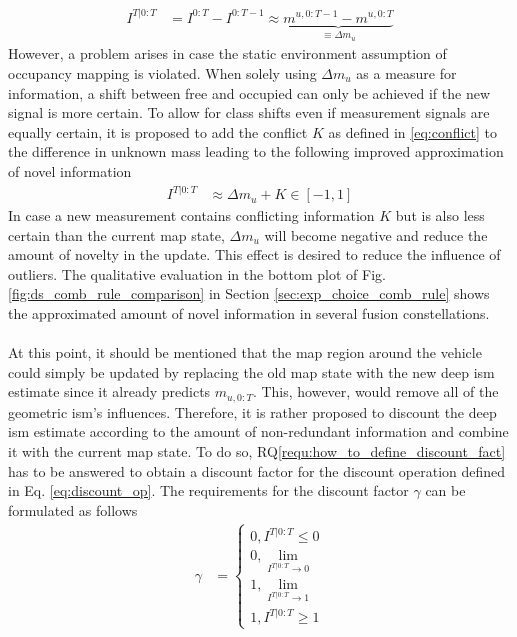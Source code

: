 \begin{align}
	\label{eq:non_redund_info_}
	I^{T|0:T} &= I^{0:T} - I^{0:T-1} \approx \underbrace{m^{u,0:T-1} - m^{u,0:T}}_{\equiv\Delta m_{u}}
\end{align}
However, a problem arises in case the static environment assumption of occupancy mapping is violated. When solely using $\Delta m_u$ as a measure for information, a shift between free and occupied can only be achieved if the new signal is more certain. To allow for class shifts even if measurement signals are equally certain, it is proposed to add the conflict $K$ as defined in \eqref{eq:conflict} to the difference in unknown mass leading to the following improved approximation of novel information 
\begin{align}
	\label{eq:non_redund_info}
	I^{T|0:T} &\approx \Delta m_{u} + K \in [-1,1]
\end{align}
In case a new measurement contains conflicting information $K$ but is also less certain than the current map state, $\Delta m_u$ will become negative and reduce the amount of novelty in the update. This effect is desired to reduce the influence of outliers. The qualitative evaluation in the bottom plot of Fig. \ref{fig:ds_comb_rule_comparison} in Section \ref{sec:exp_choice_comb_rule} shows the approximated amount of novel information in several fusion constellations.
\\\\
At this point, it should be mentioned that the map region around the vehicle could simply be updated by replacing the old map state with the new deep \gls{ism} estimate since it already predicts $m_{u,0:T}$. This, however, would remove all of the geometric \gls{ism}'s influences. Therefore, it is rather proposed to discount the deep \gls{ism} estimate according to the amount of non-redundant information and combine it with the current map state. To do so, RQ\ref{requ:how_to_define_discount_fact} has to be answered to obtain a discount factor for the discount operation defined in Eq. \ref{eq:discount_op}. The requirements for the discount factor $\gamma$ can be formulated as follows
\begin{align}
	\label{eq:discount_factor_behavior}
	\gamma &= 
	\begin{cases}
		0, I^{T|0:T} \leq 0\\
		0, \lim\limits_{I^{T|0:T} \rightarrow 0}\\
		1, \lim\limits_{I^{T|0:T} \rightarrow 1}\\
		1, I^{T|0:T} \geq 1
	\end{cases}
\end{align}
